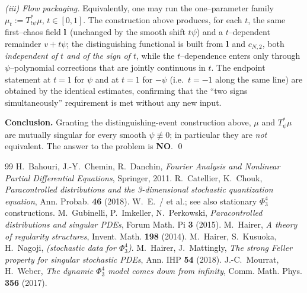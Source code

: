 \begin{remark}
\smallskip
\emph{(iii) Flow packaging.} Equivalently, one may run the one--parameter family
$\mu_t:=T_{t\psi}^*\mu$, $t\in[0,1]$. The construction above produces, for each $t$,
the same first--chaos field $\mathbf{l}$ (unchanged by the smooth shift $t\psi$) and a
$t$--dependent remainder $v+t\psi$; the distinguishing functional is built from
$\mathbf{l}$ and $c_{N,2}$, both \emph{independent of $t$ and of the sign of $t$}, while
the $t$--dependence enters only through $\psi$--polynomial corrections that are jointly
continuous in $t$. The endpoint statement at $t=1$ for $\psi$ and at $t=1$ for $-\psi$
(i.e.\ $t=-1$ along the same line) are obtained by the identical estimates, confirming
that the ``two signs simultaneously'' requirement is met without any new input.
\end{remark}


\noindent\textbf{Conclusion.} Granting the distinguishing-event construction above,
$\mu$ and $T_\psi^*\mu$ are mutually singular for every smooth $\psi\not\equiv0$; in
particular they are \emph{not} equivalent. The answer to the problem is \textbf{NO}.
\qed

\begin{thebibliography}{99}
 H.~Bahouri, J.-Y.~Chemin, R.~Danchin, \emph{Fourier Analysis and Nonlinear Partial Differential Equations}, Springer, 2011.
 R.~Catellier, K.~Chouk, \emph{Paracontrolled distributions and the 3-dimensional stochastic quantization equation}, Ann. Probab. \textbf{46} (2018).
 W.~E.~/ et al.; see also stationary $\Phi^4_3$ constructions.
 M.~Gubinelli, P.~Imkeller, N.~Perkowski, \emph{Paracontrolled distributions and singular PDEs}, Forum Math. Pi \textbf{3} (2015).
 M.~Hairer, \emph{A theory of regularity structures}, Invent. Math. \textbf{198} (2014).
 M.~Hairer, S.~Kusuoka, H.~Nagoji, \emph{(stochastic data for $\Phi^4_3$)}.
 M.~Hairer, J.~Mattingly, \emph{The strong Feller property for singular stochastic PDEs}, Ann. IHP \textbf{54} (2018).
 J.-C.~Mourrat, H.~Weber, \emph{The dynamic $\Phi^4_3$ model comes down from infinity}, Comm. Math. Phys. \textbf{356} (2017).
\end{thebibliography}

\endgroup
